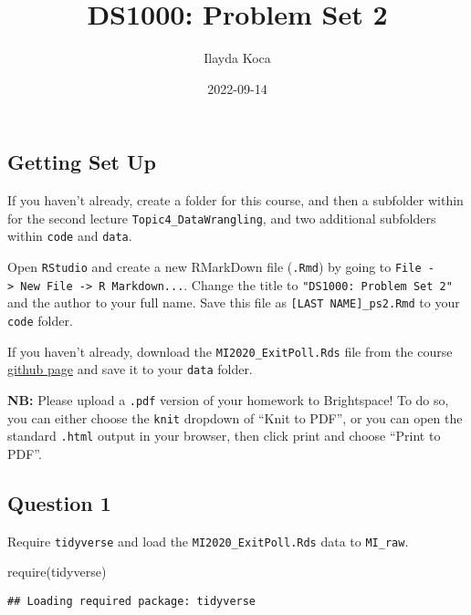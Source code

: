 \documentclass[
]{article}
\title{DS1000: Problem Set 2}
\author{Ilayda Koca}
\date{2022-09-14}
\newenvironment{Shaded}{\begin{snugshade}}{\end{snugshade}}
\newcommand{\FunctionTok}[1]{\textcolor[rgb]{0.00,0.00,0.00}{#1}}
\newcommand{\NormalTok}[1]{#1}
\begin{document}
\maketitle

\hypertarget{getting-set-up}{%
\subsection{Getting Set Up}\label{getting-set-up}}

If you haven't already, create a folder for this course, and then a
subfolder within for the second lecture \texttt{Topic4\_DataWrangling},
and two additional subfolders within \texttt{code} and \texttt{data}.

Open \texttt{RStudio} and create a new RMarkDown file (\texttt{.Rmd}) by
going to
\texttt{File\ -\textgreater{}\ New\ File\ -\textgreater{}\ R\ Markdown...}.
Change the title to \texttt{"DS1000:\ Problem\ Set\ 2"} and the author
to your full name. Save this file as \texttt{{[}LAST\ NAME{]}\_ps2.Rmd}
to your \texttt{code} folder.

If you haven't already, download the \texttt{MI2020\_ExitPoll.Rds} file
from the course
\href{https://github.com/jbisbee1/DS1000-F2022/blob/master/Lectures/Topic4_DataWrangling/data/MI2020_ExitPoll.rds}{github
page} and save it to your \texttt{data} folder.

\textbf{NB:} Please upload a \texttt{.pdf} version of your homework to
Brightspace! To do so, you can either choose the \texttt{knit} dropdown
of ``Knit to PDF'', or you can open the standard \texttt{.html} output
in your browser, then click print and choose ``Print to PDF''.

\hypertarget{question-1}{%
\subsection{Question 1}\label{question-1}}

Require \texttt{tidyverse} and load the \texttt{MI2020\_ExitPoll.Rds}
data to \texttt{MI\_raw}.

\begin{Shaded}
\begin{Highlighting}[]
\FunctionTok{require}\NormalTok{(tidyverse)}
\end{Highlighting}
\end{Shaded}

\begin{verbatim}
## Loading required package: tidyverse
\end{verbatim}
\end{document}
